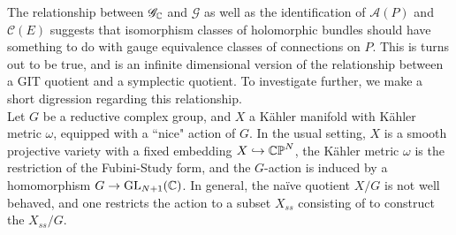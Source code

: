The relationship between $\mathscr{G}_{\mathbb{C}}$ and $\mathscr{G}$ as well
as the identification of $\mathscr{A}(P)$ and $\mathscr{C}(E)$ suggests
that isomorphism classes of holomorphic bundles should have something to
do with gauge equivalence classes of connections on $P$. This is turns out
to be true, and is an infinite dimensional version of the relationship between
a GIT quotient and a symplectic quotient. To investigate further, we make a short
digression regarding this relationship. \\

Let $G$ be a reductive complex group, and $X$ a K\"ahler manifold with K\"ahler
metric $\omega$, equipped with a ``nice" action of $G$. In the usual setting,
$X$ is a smooth projective variety with a fixed embedding $X \hookrightarrow \mathbb{CP}^N$,
the K\"ahler metric $\omega$ is the restriction of the Fubini-Study form,
and the $G$-action is induced by a homomorphism $G \to \mathrm{GL}_{N+1}(\mathbb{C})$. In general,
the na\"ive quotient $X/G$ is not well behaved, and one restricts the action to a
subset $X_{ss}$ consisting of  to construct the
 $X_{ss}/G$. \\

